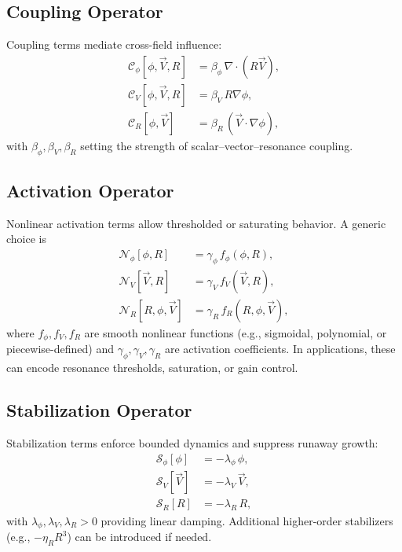 \subsection{Coupling Operator}

Coupling terms mediate cross-field influence:
\begin{align}
    \mathcal{C}_\phi[\phi, \vec{V}, R] &= \beta_\phi\, \nabla \cdot (R \vec{V}), \\
    \mathcal{C}_V[\phi, \vec{V}, R] &= \beta_V\, R \nabla \phi, \\
    \mathcal{C}_R[\phi, \vec{V}] &= \beta_R\, \left( \vec{V} \cdot \nabla \phi \right),
\end{align}
with \(\beta_\phi, \beta_V, \beta_R\) setting the strength of scalar–vector–resonance coupling.

\subsection{Activation Operator}

Nonlinear activation terms allow thresholded or saturating behavior. A generic choice is
\begin{align}
    \mathcal{N}_\phi[\phi, R] &= \gamma_\phi\, f_\phi(\phi, R), \\
    \mathcal{N}_V[\vec{V}, R] &= \gamma_V\, f_V(\vec{V}, R), \\
    \mathcal{N}_R[R, \phi, \vec{V}] &= \gamma_R\, f_R(R, \phi, \vec{V}),
\end{align}
where \(f_\phi, f_V, f_R\) are smooth nonlinear functions (e.g., sigmoidal, polynomial, or piecewise-defined) and \(\gamma_\phi, \gamma_V, \gamma_R\) are activation coefficients. In applications, these can encode resonance thresholds, saturation, or gain control.

\subsection{Stabilization Operator}

Stabilization terms enforce bounded dynamics and suppress runaway growth:
\begin{align}
    \mathcal{S}_\phi[\phi] &= -\lambda_\phi\, \phi, \\
    \mathcal{S}_V[\vec{V}] &= -\lambda_V\, \vec{V}, \\
    \mathcal{S}_R[R] &= -\lambda_R\, R,
\end{align}
with \(\lambda_\phi, \lambda_V, \lambda_R > 0\) providing linear damping. Additional higher-order stabilizers (e.g., \(-\eta_R R^3\)) can be introduced if needed.
